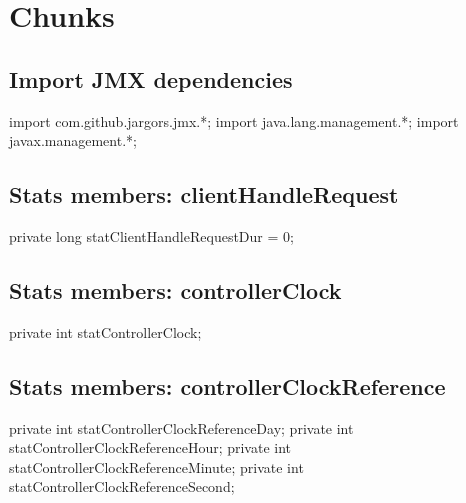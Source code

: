 \section{Chunks}
\subsection{Import JMX dependencies}
\nwenddocs{}\endmoddef{}
import com.github.jargors.jmx.*;
import java.lang.management.*;
import javax.management.*;
\nwendcode{}\nwdocspar

\subsection{Stats members: clientHandleRequest}
\nwenddocs{}\endmoddef{}
private long   statClientHandleRequestDur = 0;
\nwendcode{}\nwdocspar

\subsection{Stats members: controllerClock}
\nwenddocs{}\endmoddef{}
private int    statControllerClock;
\nwendcode{}\nwdocspar

\subsection{Stats members: controllerClockReference}
\nwenddocs{}\endmoddef{}
private int    statControllerClockReferenceDay;
private int    statControllerClockReferenceHour;
private int    statControllerClockReferenceMinute;
private int    statControllerClockReferenceSecond;
\nwendcode{}\nwdocspar

